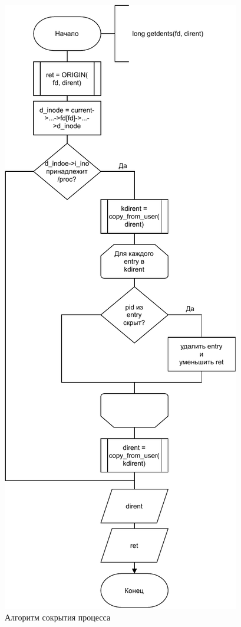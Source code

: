 \begin{figure}[H]
    \centering
    \includegraphics[scale=0.65]{pdf/oscw_proc.pdf}
    \caption{Алгоритм сокрытия процесса}\label{img:proc_hide_scheme}
\end{figure}

